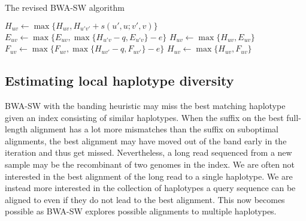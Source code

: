 \documentclass[webpdf,contemporary,large,namedate]{oup-authoring-template}%
\begin{document}
\begin{algorithm}
	\caption{The revised BWA-SW algorithm}\label{algo:bwa-sw}
	\begin{algorithmic}[1]
							\State $H_{uv}\gets \max\{H_{uv},H_{u'v'}+s(u',u;v',v)\}$
						\EndFor
					\EndFor
						\State $E_{uv}\gets\max\{E_{uv},\max\{H_{u'v}-q,E_{u'v}\}-e\}$
						\State $H_{uv}\gets\max\{H_{uv},E_{uv}\}$
					\EndFor
				\EndFor
						\State $F_{uv}\gets\max\{F_{uv},\max\{H_{uv'}-q,F_{uv'}\}-e\}$
						\State $H_{uv}\gets\max\{H_{uv},F_{uv}\}$
					\EndFor
				\EndFor
			\EndFor
		\EndProcedure
	\end{algorithmic}
\end{algorithm}

\subsection{Estimating local haplotype diversity}

BWA-SW with the banding heuristic may miss the best matching haplotype given an index consisting of similar haplotypes.
When the suffix on the best full-length alignment has a lot more mismatches than the suffix on suboptimal alignments,
the best alignment may have moved out of the band early in the iteration and thus get missed.
Nevertheless, a long read sequenced from a new sample may be the recombinant of two genomes in the index.
We are often not interested in the best alignment of the long read to a single haplotype.
We are instead more interested in the collection of haplotypes a query sequence can be aligned to even if they do not lead to the best alignment.
This now becomes possible as BWA-SW explores possible alignments to multiple haplotypes.
\end{document}
